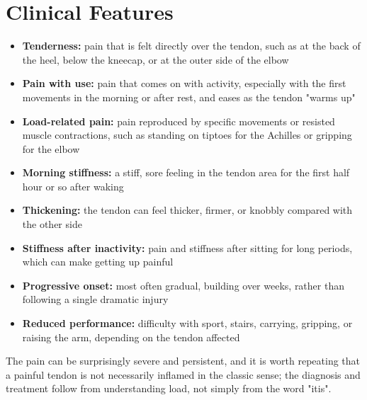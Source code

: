 \section*{Clinical Features}
\begin{itemize}
    \item \textbf{Tenderness:} pain that is felt directly over the tendon, such as at the back of the heel, below the kneecap, or at the outer side of the elbow
    \item \textbf{Pain with use:} pain that comes on with activity, especially with the first movements in the morning or after rest, and eases as the tendon "warms up"
    \item \textbf{Load-related pain:} pain reproduced by specific movements or resisted muscle contractions, such as standing on tiptoes for the Achilles or gripping for the elbow
    \item \textbf{Morning stiffness:} a stiff, sore feeling in the tendon area for the first half hour or so after waking
    \item \textbf{Thickening:} the tendon can feel thicker, firmer, or knobbly compared with the other side
    \item \textbf{Stiffness after inactivity:} pain and stiffness after sitting for long periods, which can make getting up painful
    \item \textbf{Progressive onset:} most often gradual, building over weeks, rather than following a single dramatic injury
    \item \textbf{Reduced performance:} difficulty with sport, stairs, carrying, gripping, or raising the arm, depending on the tendon affected
\end{itemize}

The pain can be surprisingly severe and persistent, and it is worth repeating that a painful tendon is not necessarily inflamed in the classic sense; the diagnosis and treatment follow from understanding load, not simply from the word "itis".

